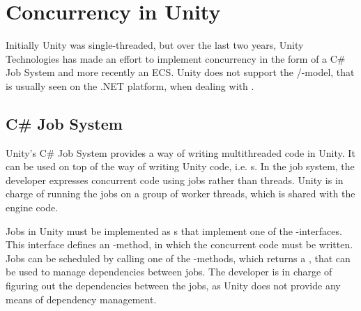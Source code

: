 \section{Concurrency in Unity} \label{sec:unity:concurrency}
Initially Unity was single-threaded, but over the last two years, Unity Technologies has made an effort to implement concurrency in the form of a C\# Job System\cite{unity:csharp:job:system} and more recently an \gls{ECS}\cite{unity:ecs}. Unity does not support the /-model, that is usually seen on the .NET platform, when dealing with \cite{unity:async,csharp:async}.

\subsection{C\# Job System}
Unity's C\# Job System provides a \textit{} way of writing multithreaded code in Unity. It can be used on top of the  way of writing Unity code, i.e. s. In the job system, the developer expresses concurrent code using jobs rather than threads. Unity is in charge of running the jobs on a group of worker threads, which is shared with the engine code\cite{unity:csharp:job:system}.

Jobs in Unity must be implemented as s that implement one of the -interfaces. This interface defines an -method, in which the concurrent code must be written. Jobs can be scheduled by calling one of the -methods, which returns a , that can be used to manage dependencies between jobs. The developer is in charge of figuring out the dependencies between the jobs, as Unity does not provide any means of dependency management\cite{unity:csharp:job:system}.


